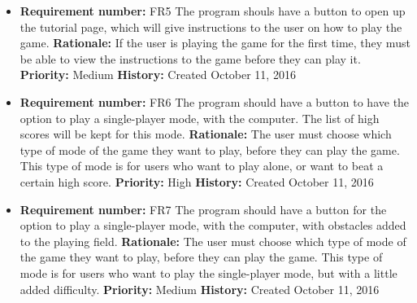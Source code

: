 \documentclass[12pt,letterpaper]{article}
\begin{document}
\begin{reqbox}
	\begin{itemize}
		\item \textbf{Requirement number: }FR5
		The program shouls have a button to open up the tutorial page, which will give instructions to the user on how to play the game.
		\textbf{Rationale: }If the user is playing the game for the first time, they must be able to view the instructions to the game before they can play it.
		\textbf{Priority: }Medium
		\textbf{History: }Created October 11, 2016
	\end{itemize}
\end{reqbox}
\begin{reqbox}
	\begin{itemize}
		\item \textbf{Requirement number: }FR6
		The program should have a button to have the option to play a single-player mode, with the computer. The list of high scores will be kept for this mode.
		\textbf{Rationale: }The user must choose which type of mode of the game they want to play, before they can play the game. This type of mode is for users who want to play alone, or want to beat a certain high score.
		\textbf{Priority: }High
		\textbf{History: }Created October 11, 2016
	\end{itemize}
\end{reqbox}
\begin{reqbox}
	\begin{itemize}
		\item \textbf{Requirement number: }FR7
		The program should have a button for the option to play a single-player mode, with the computer, with obstacles added to the playing field. 
		\textbf{Rationale: }The user must choose which type of mode of the game they want to play, before they can play the game. This type of mode is for users who want to play the single-player mode, but with a little added difficulty.
		\textbf{Priority: }Medium
		\textbf{History: }Created October 11, 2016
	\end{itemize}
\end{reqbox}
\begin{reqbox}
\end{reqbox}
\end{document}
